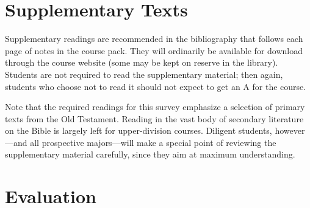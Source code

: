 \documentclass[titlepage]{article}
\begin{document}
\section{Supplementary Texts}
\label{supplementary}

Supplementary readings are recommended in the bibliography that follows
each page of notes in the course pack. They will ordinarily be available
for download through the course website (some may be kept on reserve
in the library). Students are not required to read the supplementary
material; then again, students who choose not to read it should not
expect to get an A for the course.

Note that the required readings for this survey emphasize a selection
of primary texts from the Old Testament. Reading in the vast body of
secondary literature on the Bible is largely left for upper-division
courses. Diligent students, however---and all prospective majors---will
make a special point of reviewing the supplementary material carefully,
since they aim at maximum understanding.

\section{Evaluation}
\label{evaluation}

\end{document}
